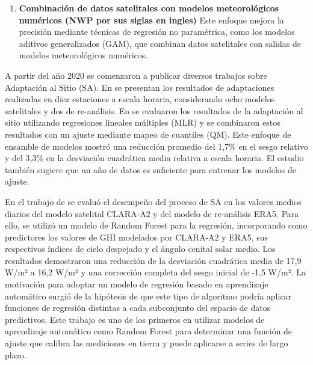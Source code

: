 \documentclass[letterpaper,12pt, twoside]{report}
\providecommand{\DIFdeltex}[1]{{\protect\color{red} \scriptsize #1}} %
\providecommand{\DIFdel}[1]{\texorpdfstring{\DIFdeltex{#1}}{}} %
\begin{document}
\begin{enumerate}
\item%
\DIFdel{\textbf{Combinación de datos satelitales con modelos meteorológicos numéricos (NWP por sus siglas en ingles)}}%
\DIFdel{Este enfoque mejora la precisión mediante técnicas de regresión no paramétrica, como los modelos aditivos generalizados (GAM), que combinan datos satelitales con salidas de modelos meteorológicos numéricos.
}
\end{enumerate}%

\DIFdel{A partir del año 2020 se comenzaron a publicar diversos trabajos sobre Adaptación al Sitio (SA). En \citep{POLO2020} se presentan los resultados de adaptaciones realizadas en diez estaciones a escala horaria, considerando ocho modelos satelitales y dos de re-análisis. En \citep{Fernández2020} se evaluaron los resultados de la adaptación al sitio utilizando regresiones lineales múltiples (MLR) y se combinaron estos resultados con un ajuste mediante mapeo de cuantiles (QM). Este enfoque de ensamble de modelos mostró una reducción promedio del 1,7\% en el sesgo relativo y del 3,3\% en la desviación cuadrática media relativa a escala horaria. El estudio también sugiere que un año de datos es suficiente para entrenar los modelos de ajuste.
}%

\DIFdel{En el trabajo de \citep{BABAR2020} se evaluó el desempeño del proceso de SA en los valores medios diarios del modelo satelital CLARA-A2 y del modelo de re-análisis ERA5. Para ello, se utilizó un modelo de Random Forest para la regresión, incorporando como predictores los valores de GHI modelados por CLARA-A2 y ERA5, sus respectivos índices de cielo despejado y el ángulo cenital solar medio. Los resultados demostraron una reducción de la desviación cuadrática media de 17,9 W/m² a 16,2 W/m² y una corrección completa del sesgo inicial de -1,5 W/m². La motivación para adoptar un modelo de regresión basado en aprendizaje automático surgió de la hipótesis de que este tipo de algoritmo podría aplicar funciones de regresión distintas a cada subconjunto del espacio de datos predictivos. Este trabajo es uno de los primeros en utilizar modelos de aprendizaje automático como Random Forest para determinar una función de ajuste que calibra las mediciones en tierra y puede aplicarse a series de largo plazo.
}%
\end{document}
